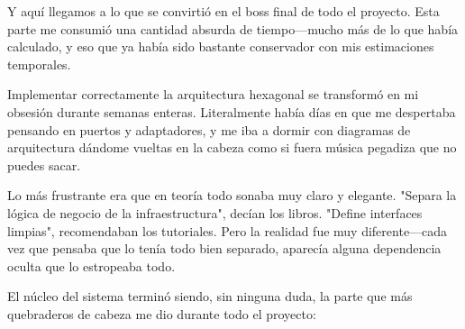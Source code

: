 Y aquí llegamos a lo que se convirtió en el boss final de todo el proyecto. Esta parte me consumió una cantidad absurda de tiempo—mucho más de lo que había calculado, y eso que ya había sido bastante conservador con mis estimaciones temporales. 

Implementar correctamente la arquitectura hexagonal se transformó en mi obsesión durante semanas enteras. Literalmente había días en que me despertaba pensando en puertos y adaptadores, y me iba a dormir con diagramas de arquitectura dándome vueltas en la cabeza como si fuera música pegadiza que no puedes sacar.

Lo más frustrante era que en teoría todo sonaba muy claro y elegante. "Separa la lógica de negocio de la infraestructura", decían los libros. "Define interfaces limpias", recomendaban los tutoriales. Pero la realidad fue muy diferente—cada vez que pensaba que lo tenía todo bien separado, aparecía alguna dependencia oculta que lo estropeaba todo.

El núcleo del sistema terminó siendo, sin ninguna duda, la parte que más quebraderos de cabeza me dio durante todo el proyecto:

